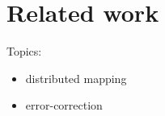 \section{Related work}
Topics:
\begin{itemize}
	\item{distributed mapping}
	\item{error-correction}
\end{itemize}